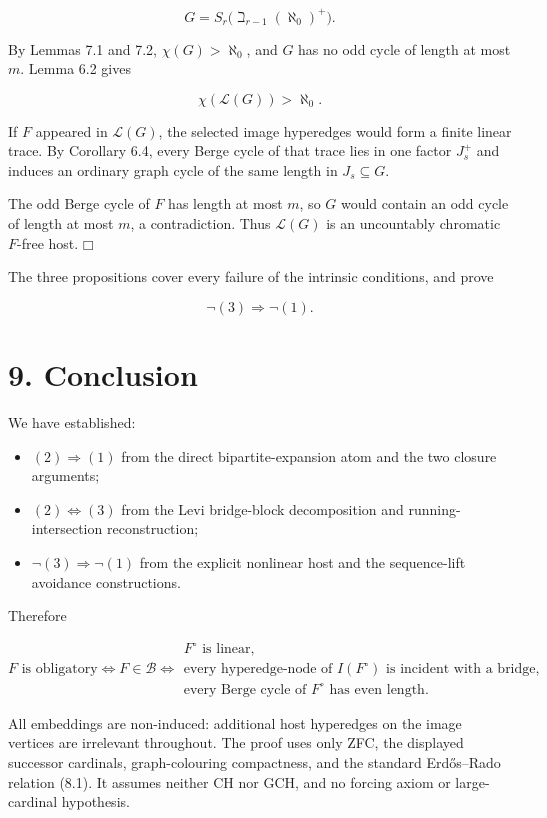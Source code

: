 \documentclass[11pt]{article}
\newcommand{\tightlist}{\setlength{\itemsep}{0pt}\setlength{\parskip}{0pt}}
\providecommand{\square}{\mdlgwhtsquare}
\begin{document}
\[
G=S_r\bigl(\beth_{r-1}(\aleph_0)^+\bigr).
\]

By Lemmas 7.1 and 7.2, \(\chi(G)>\aleph_0\), and \(G\) has no odd cycle of length at most \(m\). Lemma 6.2 gives

\[
\chi(\mathcal L(G))>\aleph_0.
\]

If \(F\) appeared in \(\mathcal L(G)\), the selected image hyperedges would form a finite linear trace. By Corollary 6.4, every Berge cycle of that trace lies in one factor \(J_s^+\) and induces an ordinary graph cycle of the same length in \(J_s\subseteq G\).

The odd Berge cycle of \(F\) has length at most \(m\), so \(G\) would contain an odd cycle of length at most \(m\), a contradiction. Thus \(\mathcal L(G)\) is an uncountably chromatic \(F\)-free host. \(\square\)

The three propositions cover every failure of the intrinsic conditions, and prove

\[
\neg(3)\Longrightarrow\neg(1). \tag{8.2}
\]

\section{9. Conclusion}\label{conclusion}

We have established:

\begin{itemize}
\tightlist
\item
  \((2)\Longrightarrow(1)\) from the direct bipartite-expansion atom and the two closure arguments;
\item
  \((2)\Longleftrightarrow(3)\) from the Levi bridge-block decomposition and running-intersection reconstruction;
\item
  \(\neg(3)\Longrightarrow\neg(1)\) from the explicit nonlinear host and the sequence-lift avoidance constructions.
\end{itemize}

Therefore

\[
\boxed{
F\text{ is obligatory}
\iff
F\in\mathcal B
\iff
\begin{array}{l}
F^\circ\text{ is linear},\\[1mm]
\text{every hyperedge-node of }I(F^\circ)
\text{ is incident with a bridge},\\[1mm]
\text{every Berge cycle of }F^\circ\text{ has even length}.
\end{array}}
\]

All embeddings are non-induced: additional host hyperedges on the image vertices are irrelevant throughout. The proof uses only ZFC, the displayed successor cardinals, graph-colouring compactness, and the standard Erdős--Rado relation (8.1). It assumes neither CH nor GCH, and no forcing axiom or large-cardinal hypothesis.
\end{document}

